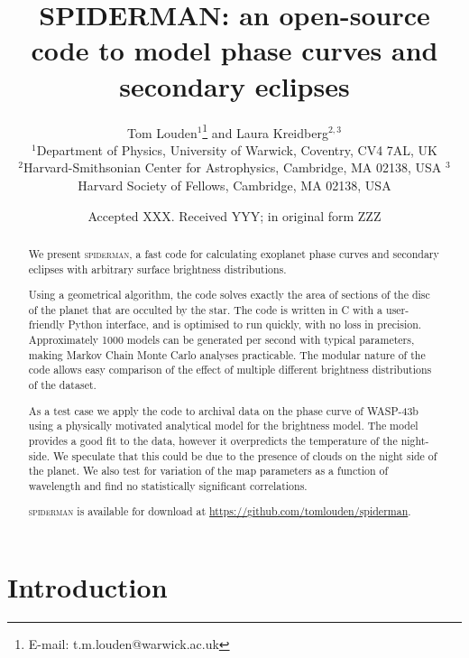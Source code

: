 \documentclass[a4paper,fleqn,usenatbib]{mnras}
\title[SPIDERMAN]{SPIDERMAN: an open-source code to model phase curves and secondary eclipses}
\author[T. Louden, L. Kreidberg]{Tom Louden$^{1}$\thanks{E-mail: t.m.louden@warwick.ac.uk} and Laura Kreidberg$^{2,3}$\\
$^{1}$Department of Physics, University of Warwick, Coventry, CV4 7AL, UK\\
$^{2}$Harvard-Smithsonian Center for Astrophysics, Cambridge, MA 02138, USA
$^{3}$Harvard Society of Fellows, Cambridge, MA 02138, USA}
\date{Accepted XXX. Received YYY; in original form ZZZ}
\begin{document}
\label{firstpage}
\pagerange{\pageref{firstpage}--\pageref{lastpage}}
\maketitle

\begin{abstract}

We present \textsc{spiderman}, a fast code for calculating exoplanet phase curves and secondary eclipses with arbitrary surface brightness distributions.

Using a geometrical algorithm, the code solves exactly the area of sections of the disc of the planet that are occulted by the star. The code is written in C with a user-friendly Python interface, and is optimised to run quickly, with no loss in precision. Approximately 1000 models can be generated per second with typical parameters, making Markov Chain Monte Carlo analyses practicable. The modular nature of the code allows easy comparison of the effect of multiple different brightness distributions of the dataset.

As a test case we apply the code to archival data on the phase curve of WASP-43b using a physically motivated analytical model for the brightness model. The model provides a good fit to the data, however it overpredicts the temperature of the night-side. We speculate that this could be due to the presence of clouds on the night side of the planet. We also test for variation of the map parameters as a function of wavelength and find no statistically significant correlations.

\textsc{spiderman} is available for download at \url{https://github.com/tomlouden/spiderman}.

\end{abstract}

\begin{keywords}
\end{keywords}



\section{Introduction}\label{sec:introduction}
\end{document}
